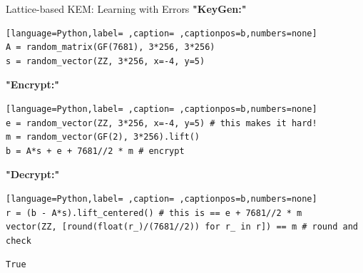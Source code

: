 \documentclass[xcolor=table,10pt,aspectratio=169]{beamer}
\begin{document}
\begin{frame}[label={sec:orga8ab36e},fragile]{Lattice-based KEM: Learning with Errors}
 \textbf{"KeyGen:"}

\begin{lstlisting}[language=Python,label= ,caption= ,captionpos=b,numbers=none]
A = random_matrix(GF(7681), 3*256, 3*256)
s = random_vector(ZZ, 3*256, x=-4, y=5)
\end{lstlisting}

\textbf{"Encrypt:"}

\begin{lstlisting}[language=Python,label= ,caption= ,captionpos=b,numbers=none]
e = random_vector(ZZ, 3*256, x=-4, y=5) # this makes it hard!
m = random_vector(GF(2), 3*256).lift()
b = A*s + e + 7681//2 * m # encrypt
\end{lstlisting}

\textbf{"Decrypt:"}

\begin{lstlisting}[language=Python,label= ,caption= ,captionpos=b,numbers=none]
r = (b - A*s).lift_centered() # this is == e + 7681//2 * m
vector(ZZ, [round(float(r_)/(7681//2)) for r_ in r]) == m # round and check
\end{lstlisting}

\begin{verbatim}
True
\end{verbatim}
\end{frame}
\end{document}
